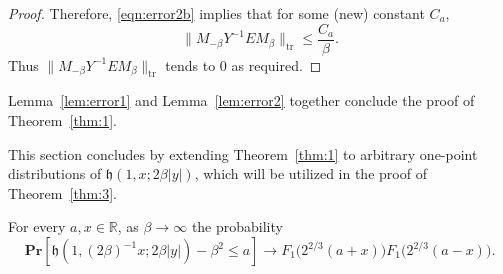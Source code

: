 \documentclass[AHL,Unicode,longabstracts]{cedram}
\DeclareMathOperator{\tr}{tr}
\newcommand{\pr}[1]{\mathbf{Pr}\left[#1\right]}
\newcommand{\R}{\mathbb{R}}
\newcommand{\h}{\mathfrak{h}}
\begin{document}
\begin{proof}
Therefore, \eqref{eqn:error2b} implies that for some (new) constant $C_a$,
\[
\| M_{-\beta}Y^{-1} E M_{\beta}\|_{\tr} \leq \frac{C_a}{\beta}.
\]
Thus $\| M_{-\beta}Y^{-1} E M_{\beta}\|_{\tr}$ tends to $0$ as required.
\end{proof}

Lemma~\ref{lem:error1} and Lemma~\ref{lem:error2} together conclude the proof of Theorem~\ref{thm:1}.

This section concludes by extending Theorem~\ref{thm:1} to arbitrary one-point distributions of $\h(1,x;2\beta|y|)$, which will be utilized in the proof of Theorem~\ref{thm:3}.

\begin{prop}\label{prop:1}
For every $a, x \in \R$, as $\beta \to \infty$ the probability
\[
\pr{\h(1, (2\beta)^{-1}x; 2\beta |y|) - \beta^2 \leq a} \longrightarrow F_1\big (2^{2/3}(a+x)\big) F_1\big(2^{2/3}(a-x)\big).
\]
\end{prop}
\end{document}

